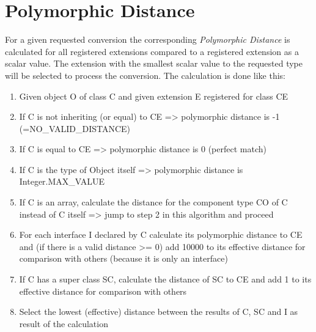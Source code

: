\section{Polymorphic Distance}
\label{feature:PolymorphicDistance}
For a given requested conversion the corresponding \emph{Polymorphic Distance} is calculated for all registered extensions compared to a registered extension as a scalar value. The extension with the smallest scalar value to the requested type will be selected to process the conversion. The calculation is done like this:
\newline
\begin{enumerate}
	\item Given object O of class C and given extension E registered for class CE
	\item If C is not inheriting (or equal) to CE => polymorphic distance is -1 (=NO\_VALID\_DISTANCE)
	\item If C is equal to CE => polymorphic distance is 0 (perfect match)
	\item If C is the type of Object itself => polymorphic distance is Integer.MAX\_VALUE
	\item If C is an array, calculate the distance for the component type CO of C instead of C itself => jump to step 2 in this algorithm and proceed
	\item For each interface I declared by C calculate its polymorphic distance to CE and (if there is a valid distance >= 0) add 10000 to its effective distance for comparison with others (because it is only an interface)
	\item If C has a super class SC, calculate the distance of SC to CE and add 1 to its effective distance for comparison with others
	\item Select the lowest (effective) distance between the results of C, SC and I as result of the calculation
\end{enumerate}

